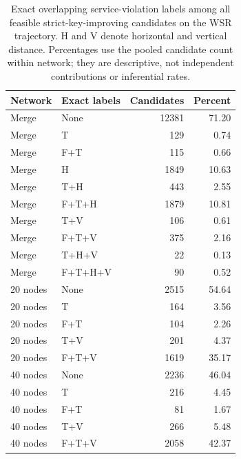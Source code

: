 \begin{table}[!htbp]
\caption{Exact overlapping service-violation labels among all feasible strict-key-improving candidates on the WSR trajectory. H and V denote horizontal and vertical distance. Percentages use the pooled candidate count within network; they are descriptive, not independent contributions or inferential rates.}\label{tab:service-split-masks}
\centering\small
\begin{tabularx}{\textwidth}{l L r r}
\toprule Network & Exact labels & Candidates & Percent\\\midrule
Merge & None & 12381 & 71.20\\
Merge & T & 129 & 0.74\\
Merge & F+T & 115 & 0.66\\
Merge & H & 1849 & 10.63\\
Merge & T+H & 443 & 2.55\\
Merge & F+T+H & 1879 & 10.81\\
Merge & T+V & 106 & 0.61\\
Merge & F+T+V & 375 & 2.16\\
Merge & T+H+V & 22 & 0.13\\
Merge & F+T+H+V & 90 & 0.52\\
20 nodes & None & 2515 & 54.64\\
20 nodes & T & 164 & 3.56\\
20 nodes & F+T & 104 & 2.26\\
20 nodes & T+V & 201 & 4.37\\
20 nodes & F+T+V & 1619 & 35.17\\
40 nodes & None & 2236 & 46.04\\
40 nodes & T & 216 & 4.45\\
40 nodes & F+T & 81 & 1.67\\
40 nodes & T+V & 266 & 5.48\\
40 nodes & F+T+V & 2058 & 42.37\\
\bottomrule
\end{tabularx}
\end{table}

